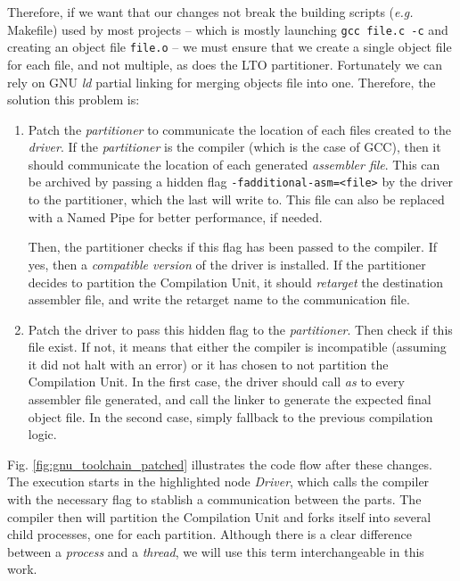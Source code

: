\documentclass[runningheads]{llncs}
\begin{document}
Therefore, if we want that our changes not break the building scripts
(\textit{e.g.} Makefile) used by most
projects -- which is mostly launching \texttt{gcc file.c -c} and creating an object file \texttt{file.o} -- we must ensure that we create a single object file for each file,
and not multiple, as does the LTO partitioner. Fortunately we can rely on GNU \textit{ld}
partial linking for merging objects file into one. Therefore, the solution this problem
is:
\begin{enumerate}
	\item Patch the \textit{partitioner} to communicate the location of
	each files created to the \textit{driver}. If the \textit{partitioner}
	is the compiler (which is the case of GCC), then it should communicate
	the location of each generated \textit{assembler file}. This can be
	archived by passing a hidden flag \texttt{-fadditional-asm=<file>}
	by the driver to the partitioner, which the last will write to. This file can also
	be replaced with a Named Pipe for better performance, if needed.

	Then, the partitioner checks if this flag has been passed to the compiler. If yes, then
	a \textit{compatible version} of the driver is installed. If the
	partitioner decides to partition the Compilation Unit, it should
	\textit{retarget} the destination assembler file, and write the retarget
	name to the communication file.

	\item Patch the driver to pass this hidden flag to the
	\textit{partitioner}.  Then check if this file exist. If not, it means that
	either the compiler is incompatible (assuming it did not halt with an
	error) or it has chosen to not partition the Compilation Unit. In the first
	case, the driver should call \textit{as} to every assembler file generated, and call
	the linker to generate the expected final object file. In the second case,
	simply fallback to the previous compilation logic.
\end{enumerate}

Fig. \ref{fig:gnu_toolchain_patched} illustrates the code flow after these
changes.  The execution starts in the highlighted node \textit{Driver}, which
calls the compiler with the necessary flag to stablish a communication between
the parts. The compiler then will partition the Compilation Unit and forks
itself into several child processes, one for each partition. Although there is
a clear difference between a \textit{process} and a \textit{thread}, we will
use this term interchangeable in this work.
\end{document}

